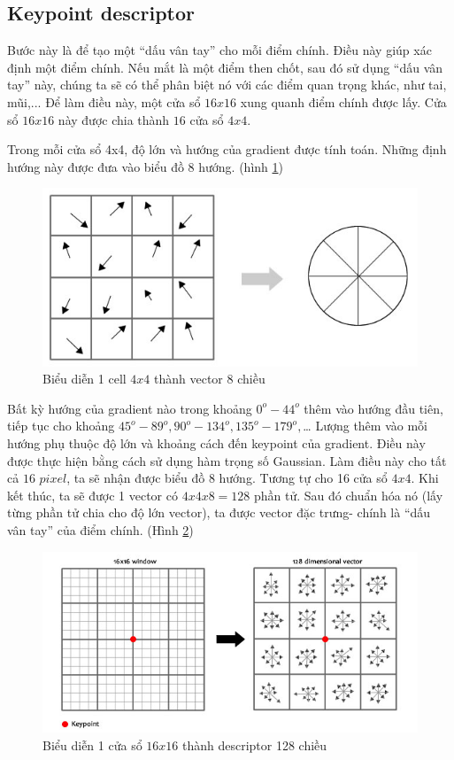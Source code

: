 \documentclass[conference]{IEEEtran}
\begin{document}
\subsection{Keypoint descriptor}
Bước này là để tạo một “dấu vân tay” cho mỗi điểm chính. Điều này giúp xác định một điểm chính. Nếu mắt là một điểm then chốt, sau đó sử dụng “dấu vân tay” này, chúng ta sẽ có thể phân biệt nó với các điểm quan trọng khác, như tai, mũi,...
Để làm điều này, một cửa sổ $16x16$ xung quanh điểm chính được lấy. Cửa sổ $16x16$ này được chia thành $16$ cửa sổ $4x4$. 

Trong mỗi cửa sổ 4x4, độ lớn và hướng của gradient được tính toán.
 Những định hướng này được đưa vào biểu đồ 8 hướng. (hình \ref{fig:tamhuong_phuong})
\begin{figure}
  \includegraphics[width=\linewidth]{tamhuong_phuong}
  \caption{Biểu diễn 1 cell $4x4$ thành vector 8 chiều }
  \label{fig:tamhuong_phuong}
\end{figure}

Bất kỳ hướng của gradient nào trong khoảng $0^o-44^o$ thêm vào hướng đầu tiên, tiếp tục cho khoảng $45^o-89^o,90^o-134^o,135^o-179^o,$… Lượng thêm vào mỗi hướng phụ thuộc độ lớn và khoảng cách đến keypoint của gradient.
Điều này được thực hiện bằng cách sử dụng hàm trọng số Gaussian.
Làm điều này cho tất cả $16$ $pixel$, ta sẽ nhận được biểu đồ 8 hướng. Tương tự cho 16 cửa sổ $4x4$. Khi kết thúc, ta sẽ được 1 vector có $4x4x8 = 128$ phần tử. Sau đó chuẩn hóa nó (lấy từng phần tử chia cho độ lớn vector), ta được vector đặc trưng- chính là “dấu vân tay” của điểm chính. (Hình \ref{fig:hinh3_phuong})
\begin{figure}
  \includegraphics[width=\linewidth]{hinh3_phuong}
  \caption{Biểu diễn 1 cửa sổ $16x16$ thành descriptor 128 chiều}
  \label{fig:hinh3_phuong}
\end{figure}
\end{document}
